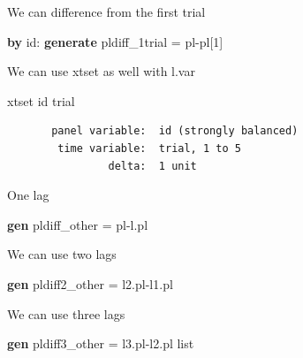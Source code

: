 \documentclass[
]{book}
\newenvironment{Shaded}{\begin{snugshade}}{\end{snugshade}}
\newcommand{\KeywordTok}[1]{\textcolor[rgb]{0.13,0.29,0.53}{\textbf{#1}}}
\newcommand{\NormalTok}[1]{#1}
\newcommand{\OtherTok}[1]{\textcolor[rgb]{0.56,0.35,0.01}{#1}}
\begin{document}
We can difference from the first trial

\begin{Shaded}
\begin{Highlighting}[]
\KeywordTok{by}\NormalTok{ id: }\KeywordTok{generate}\NormalTok{ pldiff\_1trial = pl{-}pl[1]}
\end{Highlighting}
\end{Shaded}

We can use xtset as well with l.var

\begin{Shaded}
\begin{Highlighting}[]
\NormalTok{xtset id trial}
\end{Highlighting}
\end{Shaded}

\begin{verbatim}
       panel variable:  id (strongly balanced)
        time variable:  trial, 1 to 5
                delta:  1 unit
\end{verbatim}

One lag

\begin{Shaded}
\begin{Highlighting}[]
\KeywordTok{gen}\NormalTok{ pldiff\_other = pl{-}}\OtherTok{l}\NormalTok{.pl}
\end{Highlighting}
\end{Shaded}

We can use two lags

\begin{Shaded}
\begin{Highlighting}[]
\KeywordTok{gen}\NormalTok{ pldiff2\_other = l2.pl{-}l1.pl}
\end{Highlighting}
\end{Shaded}

We can use three lags

\begin{Shaded}
\begin{Highlighting}[]
\KeywordTok{gen}\NormalTok{ pldiff3\_other = l3.pl{-}l2.pl}
\OtherTok{list}
\end{Highlighting}
\end{Shaded}
\end{document}
